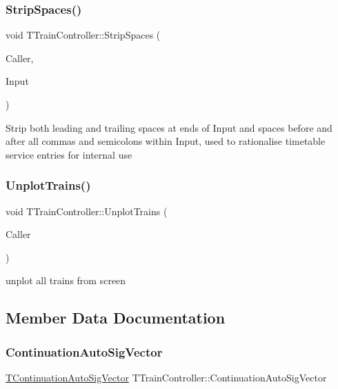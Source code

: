 \subsubsection{\texorpdfstring{Strip\+Spaces()}{StripSpaces()}}
{\footnotesize\ttfamily void T\+Train\+Controller\+::\+Strip\+Spaces (\begin{DoxyParamCaption}\item[{int}]{Caller,  }\item[{Ansi\+String \&}]{Input }\end{DoxyParamCaption})}

Strip both leading and trailing spaces at ends of Input and spaces before and after all commas and semicolons within Input, used to rationalise timetable service entries for internal use \mbox{\label{class_t_train_controller_a7e2abfcc38e51933883d959c4155aca0}} 
\subsubsection{\texorpdfstring{Unplot\+Trains()}{UnplotTrains()}}
{\footnotesize\ttfamily void T\+Train\+Controller\+::\+Unplot\+Trains (\begin{DoxyParamCaption}\item[{int}]{Caller }\end{DoxyParamCaption})}

unplot all trains from screen 

\subsection{Member Data Documentation}
\mbox{\label{class_t_train_controller_a0b412f7b88f829632e54bffc0659ac3b}} 
\subsubsection{\texorpdfstring{Continuation\+Auto\+Sig\+Vector}{ContinuationAutoSigVector}}
{\footnotesize\ttfamily \mbox{\hyperlink{class_t_train_controller_a1908f7d1a5dcfebf2f747efbdd6f4681}{T\+Continuation\+Auto\+Sig\+Vector}} T\+Train\+Controller\+::\+Continuation\+Auto\+Sig\+Vector}


